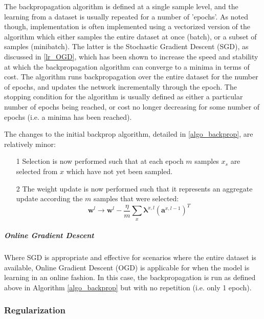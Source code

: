 \documentclass[a4paper,11pt,oneside]{article}
\theoremstyle{plain}
\theoremstyle{definition}
\begin{document}
	The backpropagation algorithm is defined at a single sample level, and the learning from a dataset is usually repeated for a number of 'epochs'. As noted though, implementation is often implemented using a vectorized version of the algorithm which either samples the entire dataset at once (batch), or a subset of samples (minibatch). The latter is the Stochastic Gradient Descent (SGD), as discussed in \ref{lr_OGD}, which has been shown to increase the speed and stability at which the backpropagation algorithm can converge to a minima in terms of cost. The algorithm runs backpropagation over the entire dataset for the number of epochs, and updates the network incrementally through the epoch. The stopping condition for the algorithm is usually defined as either a particular number of epochs being reached, or cost no longer decreasing for some number of epochs (i.e. a minima has been reached).\newline
	
	The changes to the initial backprop algorithm, detailed in \ref{algo_backprop}, are relatively minor:
	\begin{itemize}
		\item [1] Selection is now performed such that at each epoch $m$ samples $x_s$ are selected from $x$ which have not yet been sampled.
		\item [2] The weight update is now performed such that it represents an aggregate update according the $m$ samples that were selected:
		\begin{equation}\label{eq_backprop_weightupdate_sgd}
		\mathbf{w}^l \rightarrow \mathbf{w}^l - \frac{\eta}{m} \sum_{x} \mathbf{\lambda}^{x, l} (\mathbf{a}^{x, l - 1})^T
		\end{equation}
	\end{itemize}
	
	\texttt{}\newline 
	
	\subparagraph{Online Gradient Descent}
	Where SGD is appropriate and effective for scenarios where the entire dataset is available, Online Gradient Descent (OGD) is applicable for when the model is learning in an online fashion. In this case, the backpropagation is run as defined above in Algorithm \ref{algo_backprop} but with no repetition (i.e. only 1 epoch).
	
	\subsubsection{Regularization}\label{imp_regularization}
	
\end{document}
